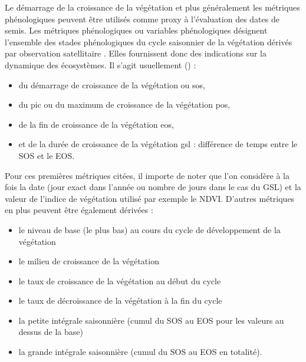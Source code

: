 Le démarrage de la croissance de la végétation et plus généralement les métriques phénologiques peuvent être utilisés comme proxy à l'évaluation des dates de semis. Les métriques phénologiques
ou variables phénologiques désignent l'ensemble des stades phénologiques du cycle saisonnier de la végétation dérivés par observation satellitaire \citep{Helman2018}. Elles fournissent 
donc des indications sur la dynamique des écosystèmes.
Il s'agit usuellement () : 
\begin{itemize}
 \item du démarrage de croissance de la végétation ou \acrshort{sos},
 \item du pic ou du maximum de croissance de la végétation \acrshort{pos},
 \item de la fin de croissance de la végétation \acrshort{eos},
 \item et de la durée de croissance de la végétation \acrshort{gsl} : différence de temps entre le SOS et le EOS.
\end{itemize}
Pour ces premières métriques citées, il importe de noter que l'on considère à la fois la date (jour exact dans l'année ou nombre de jours dans le cas du GSL) et la valeur de l'indice de 
végétation utilisé par exemple le NDVI. D'autres métriques en plus peuvent être également dérivées : 
\begin{itemize}
 \item le niveau de base (le plus bas) au cours du cycle de développement de la végétation
 \item le milieu de croissance de la végétation
 \item le taux de croissance de la végétation au début du cycle
 \item le taux de décroissance de la végétation à la fin du cycle
 \item la petite intégrale saisonnière (cumul du SOS au EOS pour les valeurs au dessus de la base)
 \item la grande intégrale saisonnière (cumul du SOS au EOS en totalité).
\end{itemize}

